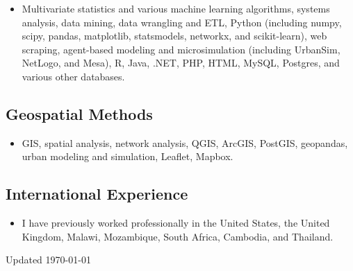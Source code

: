 \documentclass{academiccv}
\begin{document}
\begin{itemize}
\item Multivariate statistics and various machine learning algorithms, systems analysis, data mining, data wrangling and ETL, Python (including numpy, scipy, pandas, matplotlib, statsmodels, networkx, and scikit-learn), web scraping, agent-based modeling and microsimulation (including UrbanSim, NetLogo, and Mesa), R, Java, .NET, PHP, HTML, MySQL, Postgres, and various other databases.
\end{itemize}

\subsection*{Geospatial Methods}

\begin{itemize}
\item GIS, spatial analysis, network analysis, QGIS, ArcGIS, PostGIS, geopandas, urban modeling and simulation, Leaflet, Mapbox.
\end{itemize}

\subsection*{International Experience}

\begin{itemize}
\item I have previously worked professionally in the United States, the United Kingdom, Malawi, Mozambique, South Africa, Cambodia, and Thailand.
\end{itemize}



\begin{center}
\vspace{6em}
Updated \monthyeardate\today
\end{center} 
\end{document}
